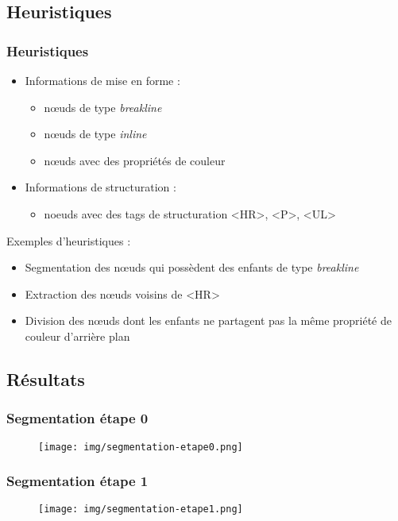 \documentclass[]{beamer}
\begin{document}
\subsection{Heuristiques}
\begin{frame}
\frametitle{Heuristiques}
\begin{itemize}
	\item Informations de mise en forme : 
	\begin{itemize}
		\item nœuds de type\textit{ breakline}
		\item nœuds de type \textit{inline}
		\item nœuds avec des propriétés de couleur
	\end{itemize}
	\item Informations de structuration :
	\begin{itemize}
		\item noeuds avec des tags de structuration <HR>, <P>, <UL>
	\end{itemize}
\end{itemize}

\begin{block}{Exemples d'heuristiques : }
\begin{itemize}
	\item Segmentation des nœuds qui possèdent des enfants de type \textit{breakline}
	\item Extraction des nœuds voisins de <HR>
	\item Division des nœuds dont les enfants ne partagent pas la même propriété de couleur d'arrière plan
\end{itemize}
\end{block}
\end{frame}

\subsection{Résultats}
\begin{frame}
\frametitle{Segmentation étape 0}
\begin{figure}
\centering
\texttt{[image: img/segmentation-etape0.png]}
\end{figure}
\end{frame}

\begin{frame}
\frametitle{Segmentation étape 1}
\begin{figure}
\centering
\texttt{[image: img/segmentation-etape1.png]}
\end{figure}
\end{frame}
\end{document}
